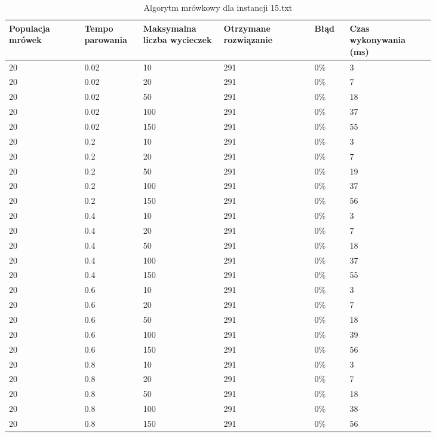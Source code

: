 \documentclass[12pt,a4paper,titlepage]{article}
\begin{document}
\begin{table}[H]
	\caption{Algorytm mrówkowy dla instancji 15.txt}
    \centering
	\begin{tabular}{|p{0.15\linewidth}|p{0.10\linewidth}|p{0.16\linewidth}|p{0.18\linewidth}|p{0.07\linewidth}|p{0.17\linewidth}|}
		\hline
        Populacja mrówek & Tempo parowania & Maksymalna liczba \newline wycieczek & Otrzymane rozwiązanie & Błąd & Czas \newline wykonywania (ms) \\
		\hline
        20 & 0.02 & 10 & 291 & 0\% & 3 \\
        20 & 0.02 & 20 & 291 & 0\% & 7 \\
        20 & 0.02 & 50 & 291 & 0\% & 18 \\
        20 & 0.02 & 100 & 291 & 0\% & 37 \\
        20 & 0.02 & 150 & 291 & 0\% & 55 \\
        \hline
        20 & 0.2 & 10 & 291 & 0\% & 3 \\
        20 & 0.2 & 20 & 291 & 0\% & 7 \\
        20 & 0.2 & 50 & 291 & 0\% & 19 \\
        20 & 0.2 & 100 & 291 & 0\% & 37 \\
        20 & 0.2 & 150 & 291 & 0\% & 56 \\
        \hline
        20 & 0.4 & 10 & 291 & 0\% & 3 \\
        20 & 0.4 & 20 & 291 & 0\% & 7 \\
        20 & 0.4 & 50 & 291 & 0\% & 18 \\
        20 & 0.4 & 100 & 291 & 0\% & 37 \\
        20 & 0.4 & 150 & 291 & 0\% & 55 \\
        \hline
        20 & 0.6 & 10 & 291 & 0\% & 3 \\
        20 & 0.6 & 20 & 291 & 0\% & 7 \\
        20 & 0.6 & 50 & 291 & 0\% & 18 \\
        20 & 0.6 & 100 & 291 & 0\% & 39 \\
        20 & 0.6 & 150 & 291 & 0\% & 56 \\
        \hline
        20 & 0.8 & 10 & 291 & 0\% & 3 \\
        20 & 0.8 & 20 & 291 & 0\% & 7 \\
        20 & 0.8 & 50 & 291 & 0\% & 18 \\
        20 & 0.8 & 100 & 291 & 0\% & 38 \\
        20 & 0.8 & 150 & 291 & 0\% & 56 \\
        \hline
    \end{tabular}
\end{table}
\end{document}
